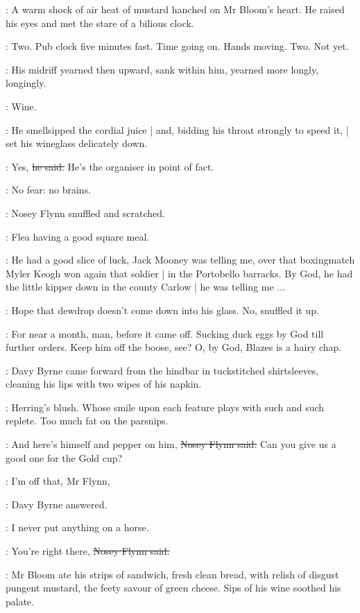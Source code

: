 :
A warm shock of air heat of mustard hanched on Mr Bloom's heart.
He raised his eyes and met the stare of a bilious clock.

\BloomInt:
Two.
Pub clock five minutes fast.
Time going on.
Hands moving.
Two.
Not yet.

:
His midriff yearned then upward,
sank within him,
yearned more longly,
longingly.

\BloomInt:
Wine.

:
He smellsipped the cordial juice |
and, bidding his throat strongly to speed it, |
set his wineglass delicately down.

\Bloom:
Yes,
\sout{he said.}
He's the organiser in point of fact.

\BloomInt:
No fear:
no brains.

:
Nosey Flynn snuffled and scratched.

\BloomInt:
Flea having a good square meal.

\nosey:
He had a good slice of luck,
Jack Mooney was telling me,
over that boxingmatch Myler Keogh won again that soldier |
in the Portobello barracks.
By God,
he had the little kipper down in the county Carlow |
he was telling me ...

\BloomInt:
Hope that dewdrop doesn't come down into his glass.
No,
snuffled it up.

\nosey:
For near a month, man,
before it came off.
Sucking duck eggs by God till further orders.
Keep him off the boose, see?
O, by God,
Blazes is a hairy chap.

:
Davy Byrne came forward from the hindbar in tuckstitched shirtsleeves,
cleaning his lips with two wipes of his napkin.

\BloomInt:
Herring's blush.
Whose smile upon each feature plays with such and such replete.
Too much fat on the parsnips.

\nosey:
And here's himself and pepper on him,
\sout{Nosey Flynn said.}
Can you give us a good one for the Gold cup?

\davybyrne:
I'm off that, Mr Flynn,

:
Davy Byrne answered.

\davybyrne:
I never put anything on a horse.

\nosey:
You're right there,
\sout{Nosey Flynn said.}

:
Mr Bloom ate his strips of sandwich,
fresh clean bread,
with relish of disgust pungent mustard,
the feety savour of green cheese.
Sips of his wine soothed his palate.

